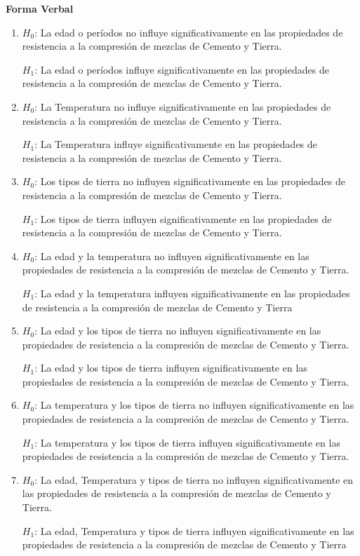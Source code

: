 \documentclass[12pt,letterpaper]{report}
\begin{document}
\textbf{Forma Verbal}
\begin{enumerate}

\item $H_0$: La edad o períodos no influye significativamente en las propiedades de resistencia a la
compresión de mezclas de Cemento y Tierra.

      $H_1$: La edad o períodos influye significativamente en las propiedades de resistencia a la
compresión de mezclas de Cemento y Tierra.

\item $H_0$: La Temperatura no influye significativamente en las propiedades de resistencia a la
compresión de mezclas de Cemento y Tierra.

      $H_1$: La Temperatura influye significativamente en las propiedades de resistencia a la
compresión de mezclas de Cemento y Tierra.

\item $H_0$: Los tipos de tierra no influyen significativamente en las propiedades de resistencia a la
compresión de mezclas de Cemento y Tierra.

      $H_1$: Los tipos de tierra influyen significativamente en las propiedades de resistencia a la
compresión de mezclas de Cemento y Tierra.

\item $H_0$: La edad y la temperatura no influyen significativamente en las propiedades de
resistencia a la compresión de mezclas de Cemento y Tierra.

      $H_1$: La edad y la temperatura influyen significativamente en las propiedades de
resistencia a la compresión de mezclas de Cemento y Tierra

\item $H_0$: La edad y los tipos de tierra no influyen significativamente en las propiedades de
resistencia a la compresión de mezclas de Cemento y Tierra.

      $H_1$: La edad y los tipos de tierra influyen significativamente en las propiedades de
resistencia a la compresión de mezclas de Cemento y Tierra.

\item $H_0$: La temperatura y los tipos de tierra no influyen significativamente en las propiedades
de resistencia a la compresión de mezclas de Cemento y Tierra.

      $H_1$: La temperatura y los tipos de tierra influyen significativamente en las propiedades de
resistencia a la compresión de mezclas de Cemento y Tierra.

\item $H_0$: La edad, Temperatura y tipos de tierra no influyen significativamente en las
propiedades de resistencia a la compresión de mezclas de Cemento y Tierra.

      $H_1$: La edad, Temperatura y tipos de tierra influyen significativamente en las propiedades
de resistencia a la compresión de mezclas de Cemento y Tierra
\end{enumerate}
\end{document}
